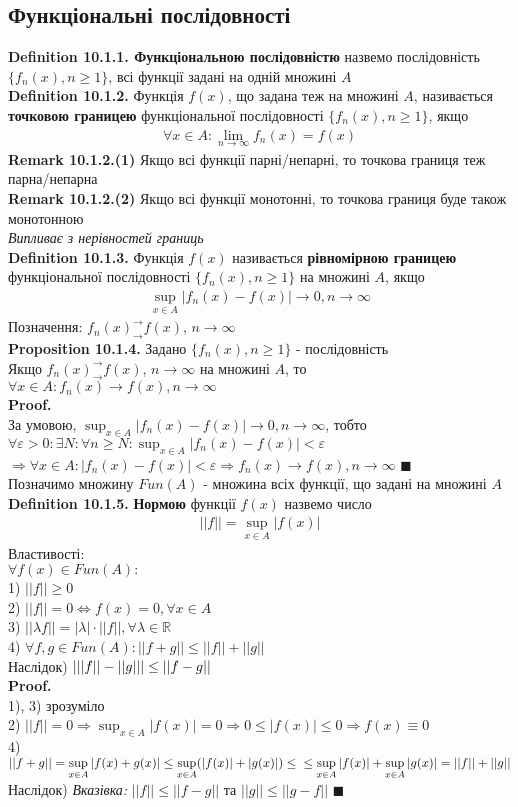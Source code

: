 \documentclass[a4paper, 14pt]{extarticle}
\def\huge{\displaystyle}
\def\bigline{\vspace{5mm}\\}
\def\defin#1{\textbf{Definition {#1}}}
\def\rm#1{\textbf{Remark {#1}}}
\def\prp#1{\textbf{Proposition {#1}}}
\def\proof{\textbf{Proof.}\\}
\def\bigline{\vspace{5mm}\\}
\def\qed{$\blacksquare$}
\begin{document}
\subsection{Функціональні послідовності}
\defin{10.1.1. Функціональною послідовністю} назвемо послідовність $\{f_n(x), n \geq 1 \}$, всі функції задані на одній множині $A$
\bigline
\defin{10.1.2.} Функція $f(x)$, що задана теж на множині $A$, називається \textbf{точковою границею} функціональної послідовності $\{f_n(x), n \geq 1\}$, якщо
\begin{align*}
\forall x \in A: \lim_{n \to \infty} f_n(x) = f(x)
\end{align*}
\rm{10.1.2.(1)} Якщо всі функції парні/непарні, то точкова границя теж парна/непарна
\bigline
\rm{10.1.2.(2)} Якщо всі функції монотонні, то точкова границя буде також монотонною\\
\textit{Випливає з нерівностей границь}
\bigline
\defin{10.1.3.} Функція $f(x)$ називається \textbf{рівномірною границею} функціональної послідовності $\{f_n(x), n \geq 1 \}$ на множині $A$, якщо
\begin{align*}
\sup_{x \in A} |f_n(x) - f(x)| \to 0, n \to \infty
\end{align*}
Позначення: $f_n(x)^\rightarrow_\rightarrow f(x)$, $n \to \infty$
\bigline
\prp{10.1.4.} Задано $\{f_n(x), n \geq 1\}$ - послідовність\\
Якщо $f_n(x)^\rightarrow_\rightarrow f(x)$, $n \to \infty$ на множині $A$, то \\ $\forall x \in A: f_n(x) \to f(x), n \to \infty$\\
\proof
За умовою, $\huge \sup_{x \in A} |f_n(x) - f(x)| \to 0, n \to \infty$, тобто\\
$\forall \varepsilon > 0: \exists N: \forall n \geq N: \huge \sup_{x \in A} |f_n(x) - f(x)| < \varepsilon$\\
$\Rightarrow \forall x \in A: |f_n(x) - f(x)| < \varepsilon \Rightarrow f_n(x) \to f(x), n \to \infty$ \qed
\bigline
Позначимо множину $Fun(A)$ - множина всіх функції, що задані на множині $A$
\bigline
\defin{10.1.5.} \textbf{Нормою} функції $f(x)$ назвемо число
\begin{align*}
||f|| = \sup_{x \in A} |f(x)|
\end{align*}
Властивості:\\
$\forall f(x) \in Fun(A):$\\
1) $||f|| \geq 0$\\
2) $||f|| = 0 \iff f(x) = 0, \forall x \in A$\\
3) $||\lambda f|| = |\lambda| \cdot ||f||, \forall \lambda \in \mathbb{R}$\\
4) $\forall f,g \in Fun(A): ||f+g|| \leq ||f|| + ||g||$\\
Наслідок) $\abs{||f||-||g||} \leq ||f-g||$\\
\proof
1), 3) зрозуміло \\
2) $||f|| = 0 \Rightarrow \huge \sup_{x \in A}|f(x)| = 0 \Rightarrow 0 \leq |f(x)| \leq 0 \Rightarrow f(x) \equiv 0$
\bigline
4) $||f+g|| = \huge \sup_{x \in A}|f(x)+g(x)| \leq \sup_{x \in A}(|f(x)| + |g(x)|) \leq  \\ \leq\sup_{x \in A}|f(x)| +\sup_{x \in A}|g(x)| = ||f|| + ||g||$
\bigline
Наслідок) \textit{Вказівка:} $||f|| \leq ||f-g||$ та $||g|| \leq ||g-f||$ \qed
\bigline
\end{document}
